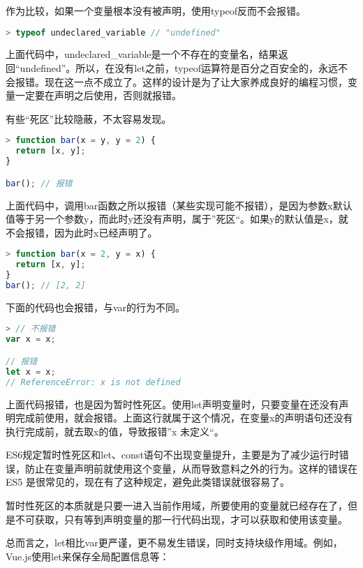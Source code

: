 作为比较，如果一个变量根本没有被声明，使用typeof反而不会报错。

\begin{lstlisting}[language=JavaScript]
> typeof undeclared_variable // "undefined"
\end{lstlisting}

上面代码中，undeclared\_variable是一个不存在的变量名，结果返回“undefined”。所以，在没有let之前，typeof运算符是百分之百安全的，永远不会报错。现在这一点不成立了。这样的设计是为了让大家养成良好的编程习惯，变量一定要在声明之后使用，否则就报错。

有些“死区”比较隐蔽，不太容易发现。

\begin{lstlisting}[language=JavaScript]
> function bar(x = y, y = 2) {
  return [x, y];
}

bar(); // 报错
\end{lstlisting}

上面代码中，调用bar函数之所以报错（某些实现可能不报错），是因为参数x默认值等于另一个参数y，而此时y还没有声明，属于”死区“。如果y的默认值是x，就不会报错，因为此时x已经声明了。

\begin{lstlisting}[language=JavaScript]
> function bar(x = 2, y = x) {
  return [x, y];
}
bar(); // [2, 2]
\end{lstlisting}


下面的代码也会报错，与var的行为不同。

\begin{lstlisting}[language=JavaScript]
> // 不报错
var x = x;

// 报错
let x = x;
// ReferenceError: x is not defined
\end{lstlisting}

上面代码报错，也是因为暂时性死区。使用let声明变量时，只要变量在还没有声明完成前使用，就会报错。上面这行就属于这个情况，在变量x的声明语句还没有执行完成前，就去取x的值，导致报错”x 未定义“。

ES6规定暂时性死区和let、const语句不出现变量提升，主要是为了减少运行时错误，防止在变量声明前就使用这个变量，从而导致意料之外的行为。这样的错误在 ES5 是很常见的，现在有了这种规定，避免此类错误就很容易了。

暂时性死区的本质就是只要一进入当前作用域，所要使用的变量就已经存在了，但是不可获取，只有等到声明变量的那一行代码出现，才可以获取和使用该变量。

总而言之，let相比var更严谨，更不易发生错误，同时支持块级作用域。例如，Vue.js使用let来保存全局配置信息等：






